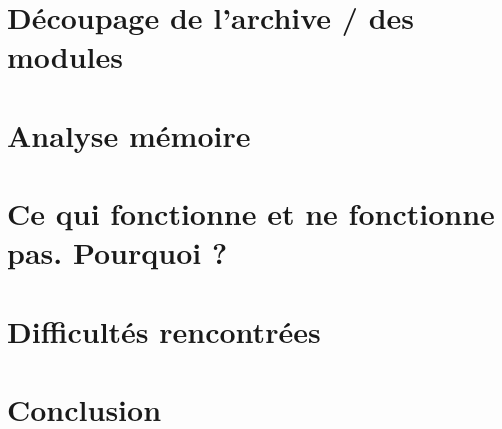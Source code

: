 \documentclass{report}
\begin{document}
\chapter{Découpage de l'archive /  des modules}

\chapter{Analyse mémoire}

\chapter{Ce qui fonctionne et ne fonctionne pas. Pourquoi ?}

\chapter{Difficultés rencontrées}

\chapter*{Conclusion}

\end{document}
